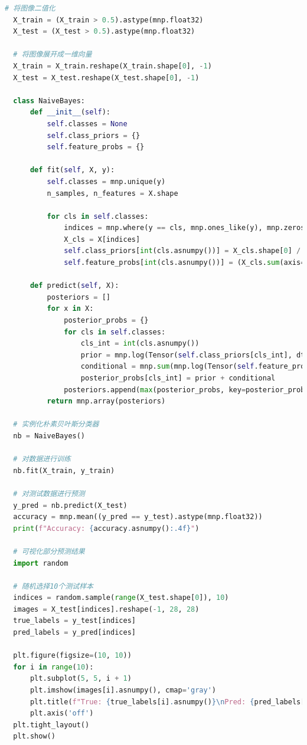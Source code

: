 \documentclass[12pt]{article}
\begin{document}
\begin{lstlisting}[language=Python]
  # 将图像二值化
  X_train = (X_train > 0.5).astype(mnp.float32)
  X_test = (X_test > 0.5).astype(mnp.float32)
  
  # 将图像展开成一维向量
  X_train = X_train.reshape(X_train.shape[0], -1)
  X_test = X_test.reshape(X_test.shape[0], -1)
  
  class NaiveBayes:
      def __init__(self):
          self.classes = None
          self.class_priors = {}
          self.feature_probs = {}
  
      def fit(self, X, y):
          self.classes = mnp.unique(y)
          n_samples, n_features = X.shape
  
          for cls in self.classes:
              indices = mnp.where(y == cls, mnp.ones_like(y), mnp.zeros_like(y)).astype(bool)
              X_cls = X[indices]
              self.class_priors[int(cls.asnumpy())] = X_cls.shape[0] / n_samples
              self.feature_probs[int(cls.asnumpy())] = (X_cls.sum(axis=0) + 1) / (X_cls.shape[0] + 2)
  
      def predict(self, X):
          posteriors = []
          for x in X:
              posterior_probs = {}
              for cls in self.classes:
                  cls_int = int(cls.asnumpy())
                  prior = mnp.log(Tensor(self.class_priors[cls_int], dtype=mnp.float32))
                  conditional = mnp.sum(mnp.log(Tensor(self.feature_probs[cls_int], dtype=mnp.float32)) * x + mnp.log(1 - Tensor(self.feature_probs[cls_int], dtype=mnp.float32)) * (1 - x))
                  posterior_probs[cls_int] = prior + conditional
              posteriors.append(max(posterior_probs, key=posterior_probs.get))
          return mnp.array(posteriors)
  
  # 实例化朴素贝叶斯分类器
  nb = NaiveBayes()
  
  # 对数据进行训练
  nb.fit(X_train, y_train)
  
  # 对测试数据进行预测
  y_pred = nb.predict(X_test)
  accuracy = mnp.mean((y_pred == y_test).astype(mnp.float32))
  print(f"Accuracy: {accuracy.asnumpy():.4f}")
  
  # 可视化部分预测结果
  import random
  
  # 随机选择10个测试样本
  indices = random.sample(range(X_test.shape[0]), 10)
  images = X_test[indices].reshape(-1, 28, 28)
  true_labels = y_test[indices]
  pred_labels = y_pred[indices]
  
  plt.figure(figsize=(10, 10))
  for i in range(10):
      plt.subplot(5, 5, i + 1)
      plt.imshow(images[i].asnumpy(), cmap='gray')
      plt.title(f"True: {true_labels[i].asnumpy()}\nPred: {pred_labels[i].asnumpy()}")
      plt.axis('off')
  plt.tight_layout()
  plt.show()  
  
\end{lstlisting}
\end{document}
